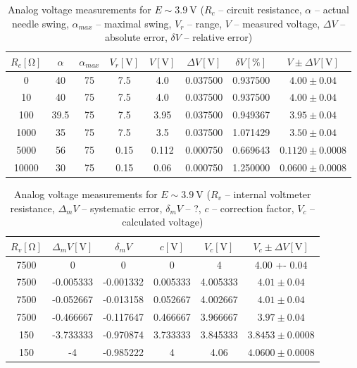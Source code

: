 \begin{table}[H]
	\centering
	\begin{tabular}{ c | c | c | c | c | c | c | c}
		$R_c [\unit{\ohm}]$ & $\alpha$ & $\alpha_{max}$  & $V_r [\unit{\volt}]$ & $V [\unit{\volt}]$ & $\Delta V [\unit{\volt}]$ & $\delta V  [\unit{\percent}]$ & $V \pm \Delta V [\unit{\volt}]$\\
		\hline
		0 & 40 & 75 & 7.5 & 4.0 & 0.037500 & 0.937500 & $4.00 \pm 0.04$\\
		\hline
		10 & 40 & 75 & 7.5 & 4.0 & 0.037500 & 0.937500 & $4.00 \pm 0.04$\\
		\hline
		100 & 39.5 & 75 & 7.5 & 3.95 & 0.037500 & 0.949367 & $3.95 \pm 0.04$\\
		\hline
		1000 & 35 & 75 & 7.5 & 3.5 & 0.037500 & 1.071429 & $3.50 \pm 0.04$\\
		\hline
		5000 & 56 & 75 & 0.15 & 0.112 & 0.000750 & 0.669643 & $0.1120 \pm 0.0008$\\
		\hline
		10000 & 30 & 75 & 0.15 & 0.06 & 0.000750 & 1.250000 & $0.0600 \pm 0.0008$
	\end{tabular}
	\caption{Analog voltage measurements for $E \sim \SI{3.9}{\volt}$ ($R_c$ -- circuit resistance, $\alpha$ -- actual needle swing, $\alpha_{max}$ -- maximal swing, $V_r$ -- range, $V$ -- measured voltage, $\Delta V$ -- absolute error, $\delta V$ -- relative error)}
	\label{tab:analog_volt_1}
\end{table}

\begin{table}[H]
	\centering
	\begin{tabular}{ c | c | c | c | c | c}
		$R_v [\unit{\ohm}]$  & $\Delta_m V [\unit{\volt}]$ & $\delta_m V $ & $c [\unit{\volt}]$ & $V_c [\unit{\volt}]$ & $V_c \pm \Delta V [\unit{\volt}]$\\
		\hline
		7500 & 0 & 0 & 0 & 4 & 4.00 +- 0.04\\
		\hline
		7500 & -0.005333 & -0.001332 & 0.005333 & 4.005333 & $4.01 \pm  0.04$\\
		\hline
		7500 & -0.052667 & -0.013158 & 0.052667 & 4.002667 & $4.01 \pm 0.04$\\
		\hline
		7500 & -0.466667 & -0.117647 & 0.466667 & 3.966667 & $3.97 \pm 0.04$\\
		\hline
		150 & -3.733333 & -0.970874 & 3.733333 & 3.845333 & $3.8453 \pm 0.0008$\\
		\hline
		150 & -4 & -0.985222 & 4 & 4.06 & $4.0600 \pm 0.0008$
	\end{tabular}
	\caption{Analog voltage measurements for $E \sim \SI{3.9}{\volt}$ ($R_v$ -- internal voltmeter resistance, $\Delta_m V$ -- systematic error, $\delta_m V$ -- ?, $c$ -- correction factor, $V_c$ -- calculated voltage)}
	\label{tab:analog_volt_2}
\end{table}

